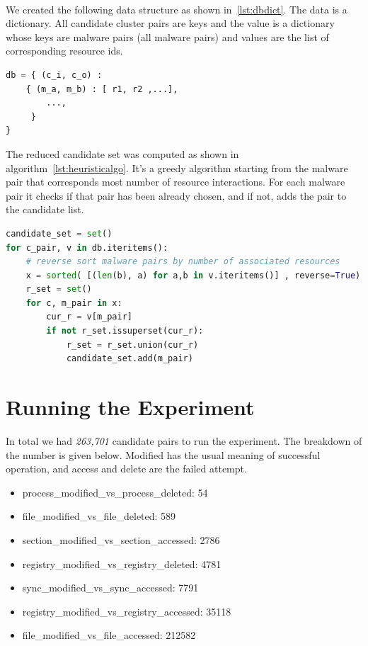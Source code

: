 \\
We created the following data structure as shown in~\ref{lst:dbdict}.
The data is a dictionary. All candidate cluster pairs are keys and the value is a dictionary whose keys are malware pairs (all malware pairs) and values are the list of corresponding resource ids.
\\
\begin{lstlisting}[language=python,floatplacement=htpb,caption={Database Structure},label={lst:dbdict}]
db = { (c_i, c_o) :
    { (m_a, m_b) : [ r1, r2 ,...],
        ...,
     }
}
\end{lstlisting}
The reduced candidate set was computed as shown in algorithm~\ref{lst:heuristicalgo}.
It's a greedy algorithm starting from the malware pair that corresponds most number of resource interactions.
For each malware pair it checks if that pair has been already chosen, and if not, adds the pair to the candidate list.
\\
\begin{lstlisting}[float,floatplacement=htbp,language=python,caption={Alogrithm to get minimal set of candidates for all resource},label={lst:heuristicalgo}]
candidate_set = set()
for c_pair, v in db.iteritems():
    # reverse sort malware pairs by number of associated resources
    x = sorted( [(len(b), a) for a,b in v.iteritems()] , reverse=True)
    r_set = set()
    for c, m_pair in x:
        cur_r = v[m_pair]
        if not r_set.issuperset(cur_r):
            r_set = r_set.union(cur_r)
            candidate_set.add(m_pair)
\end{lstlisting}
\section{Running the Experiment}
\label{sec:Running the Experiment}
In total we had \emph{263,701} candidate pairs to run the experiment.
The breakdown of the number is given below.
Modified has the usual meaning of successful operation, and access and delete are the failed attempt.
\begin{itemize}
  \item process\_modified\_vs\_process\_deleted: 54
  \item file\_modified\_vs\_file\_deleted: 589
  \item section\_modified\_vs\_section\_accessed: 2786
  \item registry\_modified\_vs\_registry\_deleted: 4781
  \item sync\_modified\_vs\_sync\_accessed: 7791
  \item registry\_modified\_vs\_registry\_accessed: 35118
  \item file\_modified\_vs\_file\_accessed: 212582
\end{itemize}
